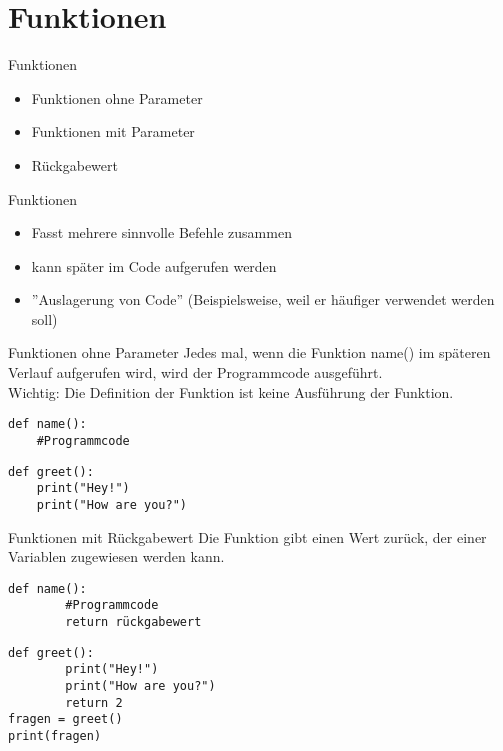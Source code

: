 \section{Funktionen}
\begin{frame}[fragile]{Funktionen}
\begin{itemize}
	\item Funktionen ohne Parameter
	\item Funktionen mit Parameter
	\item Rückgabewert 
\end{itemize}
\end{frame}

\begin{frame}[fragile]{Funktionen}
	\begin{itemize}
		\item Fasst mehrere sinnvolle Befehle zusammen
		\item kann später im Code aufgerufen werden
		\item ''Auslagerung von Code'' (Beispielsweise, weil er häufiger verwendet werden soll)
	\end{itemize}
\end{frame}

\begin{frame}[fragile]{Funktionen ohne Parameter}
Jedes mal, wenn die Funktion name() im späteren Verlauf aufgerufen wird, wird der Programmcode ausgeführt. \\
Wichtig: Die Definition der Funktion ist keine Ausführung der Funktion.
\begin{lstlisting}
def name():
	#Programmcode
\end{lstlisting}

\begin{lstlisting}
def greet():
    print("Hey!")
    print("How are you?")
\end{lstlisting}
\end{frame}

\begin{frame}[fragile]{Funktionen mit Rückgabewert}
Die Funktion gibt einen Wert zurück, der einer Variablen zugewiesen werden kann.
\begin{lstlisting}
def name():
		#Programmcode
		return rückgabewert
\end{lstlisting}

\begin{lstlisting}
def greet():
		print("Hey!")
		print("How are you?")
		return 2
fragen = greet()
print(fragen)
\end{lstlisting}
\end{frame}

